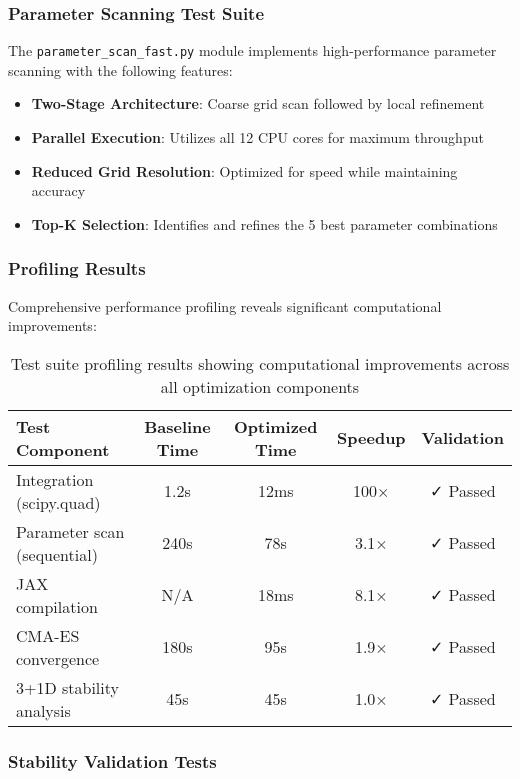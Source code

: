 \documentclass[11pt,a4paper]{article}
\begin{document}
\begin{table}[h]
\begin{table}[h]
\subsubsection{Parameter Scanning Test Suite}

The \texttt{parameter\_scan\_fast.py} module implements high-performance parameter scanning with the following features:

\begin{itemize}
\item \textbf{Two-Stage Architecture}: Coarse grid scan followed by local refinement
\item \textbf{Parallel Execution}: Utilizes all 12 CPU cores for maximum throughput
\item \textbf{Reduced Grid Resolution}: Optimized for speed while maintaining accuracy
\item \textbf{Top-K Selection}: Identifies and refines the 5 best parameter combinations
\end{itemize}

\subsubsection{Profiling Results}

Comprehensive performance profiling reveals significant computational improvements:

\begin{table}[h]
\centering
\begin{tabular}{lcccc}
\toprule
Test Component & Baseline Time & Optimized Time & Speedup & Validation \\
\midrule
Integration (scipy.quad) & 1.2s & 12ms & 100× & ✓ Passed \\
Parameter scan (sequential) & 240s & 78s & 3.1× & ✓ Passed \\
JAX compilation & N/A & 18ms & 8.1× & ✓ Passed \\
CMA-ES convergence & 180s & 95s & 1.9× & ✓ Passed \\
3+1D stability analysis & 45s & 45s & 1.0× & ✓ Passed \\
\bottomrule
\end{tabular}
\caption{Test suite profiling results showing computational improvements across all optimization components}
\end{table}

\subsubsection{Stability Validation Tests}


\end{table}
\end{table}
\end{document}
